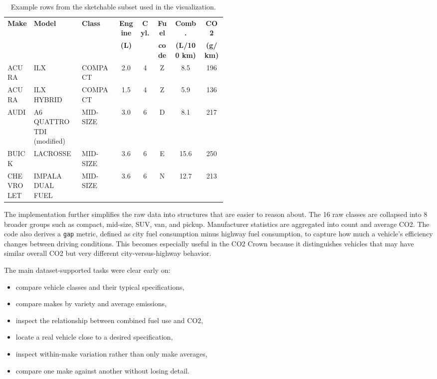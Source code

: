 \documentclass[12pt,letterpaper]{article}
\begin{document}
\begin{table}[H]
\centering
\caption{Example rows from the sketchable subset used in the visualization.}
\label{tab:subsetsample}
\scriptsize
\begin{tabularx}{\linewidth}{>{\raggedright\arraybackslash}p{0.12\linewidth}>{\raggedright\arraybackslash}p{0.22\linewidth}>{\raggedright\arraybackslash}p{0.17\linewidth}ccccc}
\toprule
\textbf{Make} & \textbf{Model} & \textbf{Class} & \textbf{Engine} & \textbf{Cyl.} & \textbf{Fuel} & \textbf{Comb.} & \textbf{CO2} \\
 &  &  & \textbf{(L)} &  & \textbf{code} & \textbf{(L/100 km)} & \textbf{(g/km)} \\
\midrule
ACURA & ILX & COMPACT & 2.0 & 4 & Z & 8.5 & 196 \\
ACURA & ILX HYBRID & COMPACT & 1.5 & 4 & Z & 5.9 & 136 \\
AUDI & A6 QUATTRO TDI (modified) & MID-SIZE & 3.0 & 6 & D & 8.1 & 217 \\
BUICK & LACROSSE & MID-SIZE & 3.6 & 6 & E & 15.6 & 250 \\
CHEVROLET & IMPALA DUAL FUEL & MID-SIZE & 3.6 & 6 & N & 12.7 & 213 \\
\bottomrule
\end{tabularx}
\end{table}

The implementation further simplifies the raw data into structures that are easier to reason about. The 16 raw classes are collapsed into 8 broader groups such as compact, mid-size, SUV, van, and pickup. Manufacturer statistics are aggregated into count and average CO2. The code also derives a \texttt{gap} metric, defined as city fuel consumption minus highway fuel consumption, to capture how much a vehicle's efficiency changes between driving conditions. This becomes especially useful in the CO2 Crown because it distinguishes vehicles that may have similar overall CO2 but very different city-versus-highway behavior.

The main dataset-supported tasks were clear early on:

\begin{itemize}
\item compare vehicle classes and their typical specifications,
\item compare makes by variety and average emissions,
\item inspect the relationship between combined fuel use and CO2,
\item locate a real vehicle close to a desired specification,
\item inspect within-make variation rather than only make averages,
\item compare one make against another without losing detail.
\end{itemize}
\end{document}
